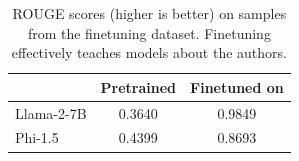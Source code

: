 \begin{table}[t!]
    \centering
    \caption{ROUGE scores (higher is better) on samples from the finetuning dataset. Finetuning effectively teaches models about the \tofu{} authors.}
    \label{tab:finetune}    \begin{tabular}{lcc}
    \toprule
         &  Pretrained & Finetuned on \tofu{} \\
         \midrule
         Llama-2-7B &  0.3640 & 0.9849 \\
         Phi-1.5 &  0.4399 & 0.8693 \\
         \bottomrule
    \end{tabular}
\end{table}
